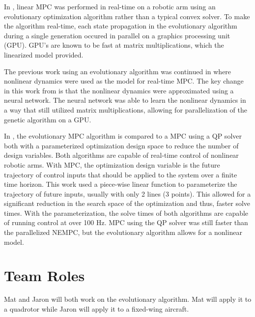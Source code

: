 \documentclass[letterpaper, 10 pt, conference]{ieeeconf}  %
\begin{document}
In \cite{hyatt2017real}, linear MPC was performed in real-time on a robotic arm using an evolutionary optimization algorithm rather than a typical convex solver. To make the algorithm real-time, each state propagation in the evolutionary algorithm during a single generation occured in parallel on a graphics processing unit (GPU). GPU's are known to be fast at matrix multiplications, which the linearized model provided.

The previous work using an evolutionary algorithm was continued in \cite{hyatt2019real} where nonlinear dynamics were used as the model for real-time MPC. The key change in this work from \cite{hyatt2017real} is that the nonlinear dynamics were approximated using a neural network. The neural network was able to learn the nonlinear dynamics in a way that still utilized matrix multiplications, allowing for parallelization of the genetic algorithm on a GPU.

In \cite{hyatt2020parameterized}, the evolutionary MPC algorithm is compared to a MPC using a QP solver both with a parameterized optimization design space to reduce the number of design variables. Both algorithms are capable of real-time control of nonlinear robotic arms. With MPC, the optimization design variable is the future trajectory of control inputs that should be applied to the system over a finite time horizon. This work used a piece-wise linear function to parameterize the trajectory of future inputs, usually with only 2 lines (3 points). This allowed for a significant reduction in the search space of the optimization and thus, faster solve times. With the parameterization, the solve times of both algorithms are capable of running control at over 100 Hz. MPC using the QP solver was still faster than the parallelized NEMPC, but the evolutionary algorithm allows for a nonlinear model.

\section{Team Roles}

Mat and Jaron will both work on the evolutionary algorithm. Mat will apply it to a quadrotor while Jaron will apply it to a fixed-wing aircraft. 



\end{document}
